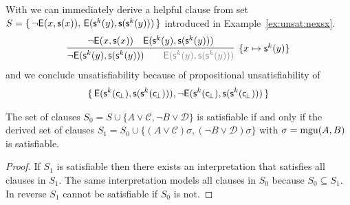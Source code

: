 \begin{example}
	With \InstGen{} we can immediately derive a helpful clause from set
\(
	S =
 \{ \,
{ \lnot\mathsf{E}(x, \mathsf{s}(x)) }, \,
{ \mathsf{E}(\mathsf{s}^k(y), \mathsf{s}(\mathsf{s}^k(y)))}
 \, \}
 \)
 introduced in Example~\ref{ex:unsat:nexsx}.
\begin{gather*}
\infer[ \{ x\mapsto\msucc^k(y)\}]{
	{ \lnot\mE(\msucc^k(y), \msucc(\msucc^k(y)))} \qquad
	{\colG \mE(\msucc^k(y), \msucc(\msucc^k(y)))}
}{
	{ \lnot\mE(x, \msucc(x)) } &
	{ \mE(\msucc^k(y), \msucc(\msucc^k(y)))}
}
\end{gather*}
and we conclude unsatisfiability because of propositional unsatisfiability of
\begin{gather*}
 \{ \,
	\mathsf{E}(\mathsf{s}^k(\mathsf{c} \!_\bot), \mathsf{s}(\mathsf{s}^k(\mathsf{c} \!_\bot))), \lnot\mathsf{E}(\mathsf{s}^k(\mathsf{c} \!_\bot), \mathsf{s}(\mathsf{s}^k(\mathsf{c} \!_\bot)))
 \, \}
\end{gather*}

\end{example}

\begin{lemma}
	The set of clauses
	\(
		S_0 = S \cup
	 \{
		 A\lor\mathcal C, \lnot B\lor\mathcal D
	\}
	 \)
	is satisfiable if and only if
	the derived set of clauses
	\( S_1 = S_0 \cup \{ (A\lor\mathcal C)\sigma, (\lnot B\lor\mathcal D)\sigma \} \)
	with \( \sigma = \operatorname{mgu}(A,B) \) is satisfiable.
\end{lemma}

\begin{proof}
	If \( S_1 \) is satisfiable then there exists an interpretation that satisfies all clauses in \( S_1 \).
	The same interpretation models all clauses in \( S_0 \) because \( S_0\subseteq S_1 \).
	In reverse \( S_1 \) cannot be satisfiable if \( S_0 \) is not.


\end{proof}

